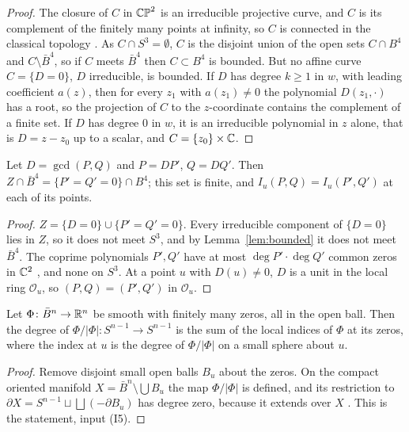 \begin{proof}
The closure of $C$ in $\mathbb{CP}^2$ is an irreducible projective curve, and $C$ is its complement of the finitely many points at infinity, so $C$ is connected in the classical topology \cite[Corollary~(4.16)]{Mum76}. As $C\cap S^3=\emptyset$, $C$ is the disjoint union of the open sets $C\cap B^4$ and $C\setminus\bar B^4$, so if $C$ meets $\bar B^4$ then $C\subset B^4$ is bounded. But no affine curve $C=\{D=0\}$, $D$ irreducible, is bounded. If $D$ has degree $k\ge1$ in $w$, with leading coefficient $a(z)$, then for every $z_1$ with $a(z_1)\neq0$ the polynomial $D(z_1,\cdot)$ has a root, so the projection of $C$ to the $z$-coordinate contains the complement of a finite set. If $D$ has degree $0$ in $w$, it is an irreducible polynomial in $z$ alone, that is $D=z-z_0$ up to a scalar, and $C=\{z_0\}\times\mathbb{C}$.
\end{proof}

\begin{lemma}[Finiteness]\label{lem:finite}
Let $D=\gcd(P,Q)$ and $P=DP'$, $Q=DQ'$. Then $Z\cap\bar B^4=\{P'=Q'=0\}\cap B^4$; this set is finite, and $I_u(P,Q)=I_u(P',Q')$ at each of its points.
\end{lemma}

\begin{proof}
$Z=\{D=0\}\cup\{P'=Q'=0\}$. Every irreducible component of $\{D=0\}$ lies in $Z$, so it does not meet $S^3$, and by Lemma~\ref{lem:bounded} it does not meet $\bar B^4$. The coprime polynomials $P',Q'$ have at most $\deg P'\cdot\deg Q'$ common zeros in $\mathbb{C}^2$ \cite[Section~5.3]{Ful69}, and none on $S^3$. At a point $u$ with $D(u)\neq0$, $D$ is a unit in the local ring $\mathcal O_u$, so $(P,Q)=(P',Q')$ in $\mathcal O_u$.
\end{proof}

\begin{lemma}\label{lem:indexsum}
Let $\Phi\colon\bar B^{n}\to\mathbb{R}^{n}$ be smooth with finitely many zeros, all in the open ball. Then the degree of $\Phi/|\Phi|\colon S^{n-1}\to S^{n-1}$ is the sum of the local indices of $\Phi$ at its zeros, where the index at $u$ is the degree of $\Phi/|\Phi|$ on a small sphere about $u$.
\end{lemma}

\begin{proof}
Remove disjoint small open balls $B_u$ about the zeros. On the compact oriented manifold $X=\bar B^n\setminus\bigcup B_u$ the map $\Phi/|\Phi|$ is defined, and its restriction to $\partial X=S^{n-1}\sqcup\bigsqcup(-\partial B_u)$ has degree zero, because it extends over $X$ \cite[Section~5, Lemma~1]{Mil65}. This is the statement, input (I5).
\end{proof}

